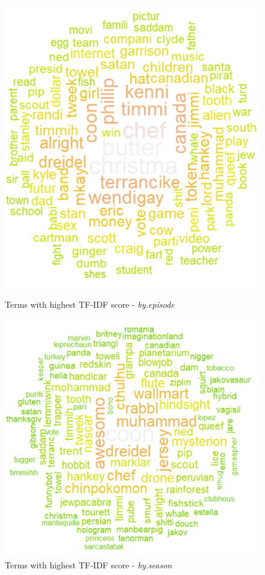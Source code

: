 \documentclass[10pt,a4paper]{article}
\begin{document}
	\begin{figure}[!tbp]
  \centering
  \begin{minipage}[b]{0.45\textwidth}
    \includegraphics[width=\textwidth]{images/WordCloud-TFIDF-episode.png}
    \caption{ Terms with highest TF-IDF score - \textit{by.episode}}
	\label{fig:WordCloud-TFIDF-ep}
  \end{minipage}
  \hfill
  \begin{minipage}[b]{0.5\textwidth}
    \includegraphics[width=\textwidth]{images/WordCloud-TFIDF.png}
    \caption{Terms with highest TF-IDF score - \textit{by.season}}
	\label{fig:WordCloud-TFIDF-s}
  \end{minipage}
\end{figure}
\end{document}
